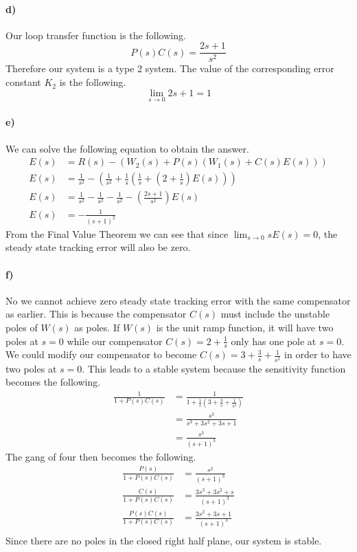 \documentclass[12pt]{article}
\begin{document}
\paragraph{d)}

Our loop transfer function is the following.
\[P(s)C(s)=\frac{2s+1}{s^2}\]
Therefore our system is a type 2 system. The value of the corresponding error constant \(K_2\) is the following.
\[\lim_{s\to0} 2s+1 = 1\]

\paragraph{e)}

We can solve the following equation to obtain the answer.
\begin{align*}
    E(s)&=R(s)-(W_2(s)+P(s)(W_1(s)+C(s)E(s)))\\
    E(s)&=\frac{1}{s^2}-\left(\frac{1}{s^2}+\frac{1}{s}\left(\frac{1}{s}+\left(2+\frac{1}{s}\right)E(s)\right)\right)\\
    E(s)&=\frac{1}{s^2}-\frac{1}{s^2}-\frac{1}{s^2}-\left(\frac{2s+1}{s^2}\right)E(s)\\
    E(s)&=-\frac{1}{(s+1)^2}
\end{align*}
From the Final Value Theorem we can see that since \(\lim_{s\to0} sE(s)=0\), the steady state tracking
error will also be zero.

\paragraph{f)}

No we cannot achieve zero steady state tracking error with the same compensator as earlier. This is because the
compensator \(C(s)\) must include the unstable poles of \(W(s)\) as poles. If \(W(s)\) is the unit ramp function,
it will have two poles at \(s=0\) while our compensator \(C(s)=2+\frac{1}{s}\) only has one pole at \(s=0\).
We could modify our compensator to become \(C(s)=3+\frac{3}{s}+\frac{1}{s^2}\) in order to have two poles at
\(s=0\). This leads to a stable system because the sensitivity function becomes the following.
\begin{align*}
    \frac{1}{1+P(s)C(s)}&=\frac{1}{1+\frac{1}{s}\left(3+\frac{3}{s}+\frac{1}{s^2}\right)}\\
    &=\frac{s^3}{s^3+3s^2+3s+1}\\
    &=\frac{s^3}{(s+1)^3}
\end{align*}
The gang of four then becomes the following.
\begin{align*}
    \frac{P(s)}{1+P(s)C(s)}&=\frac{s^2}{(s+1)^3}\\
    \frac{C(s)}{1+P(s)C(s)}&=\frac{3s^3+3s^2+s}{(s+1)^3}\\
    \frac{P(s)C(s)}{1+P(s)C(s)}&=\frac{3s^2+3s+1}{(s+1)^3}\\
\end{align*}
Since there are no poles in the closed right half plane, our system is stable.
\end{document}
